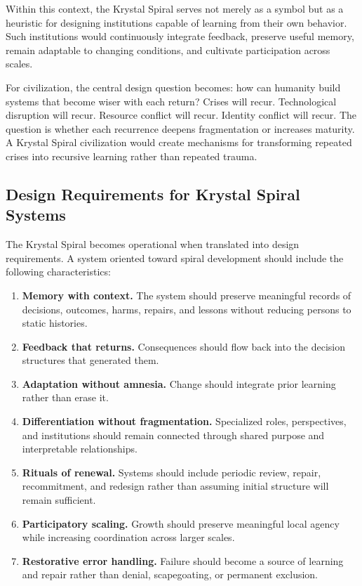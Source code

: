 \documentclass[12pt]{article}
\begin{document}
Within this context, the Krystal Spiral serves not merely as a symbol but as a heuristic for designing institutions capable of learning from their own behavior. Such institutions would continuously integrate feedback, preserve useful memory, remain adaptable to changing conditions, and cultivate participation across scales.

For civilization, the central design question becomes: how can humanity build systems that become wiser with each return? Crises will recur. Technological disruption will recur. Resource conflict will recur. Identity conflict will recur. The question is whether each recurrence deepens fragmentation or increases maturity. A Krystal Spiral civilization would create mechanisms for transforming repeated crises into recursive learning rather than repeated trauma.

\subsection{Design Requirements for Krystal Spiral Systems}

The Krystal Spiral becomes operational when translated into design requirements. A system oriented toward spiral development should include the following characteristics:

\begin{enumerate}
  \item \textbf{Memory with context.} The system should preserve meaningful records of decisions, outcomes, harms, repairs, and lessons without reducing persons to static histories.
  \item \textbf{Feedback that returns.} Consequences should flow back into the decision structures that generated them.
  \item \textbf{Adaptation without amnesia.} Change should integrate prior learning rather than erase it.
  \item \textbf{Differentiation without fragmentation.} Specialized roles, perspectives, and institutions should remain connected through shared purpose and interpretable relationships.
  \item \textbf{Rituals of renewal.} Systems should include periodic review, repair, recommitment, and redesign rather than assuming initial structure will remain sufficient.
  \item \textbf{Participatory scaling.} Growth should preserve meaningful local agency while increasing coordination across larger scales.
  \item \textbf{Restorative error handling.} Failure should become a source of learning and repair rather than denial, scapegoating, or permanent exclusion.
\end{enumerate}
\end{document}
